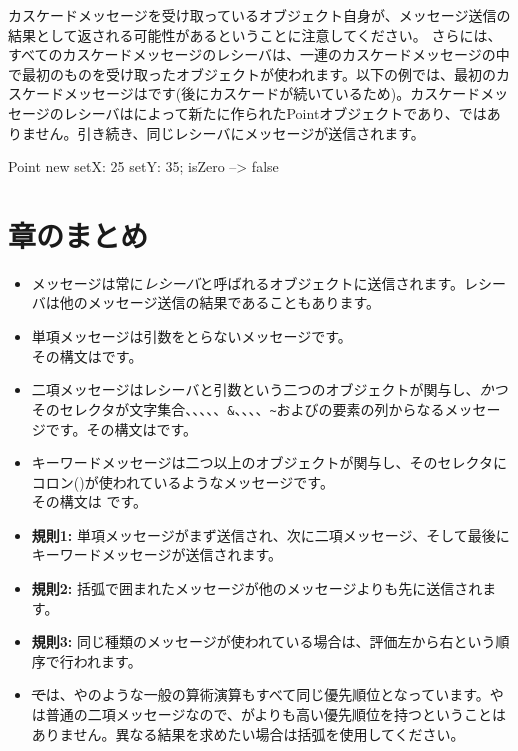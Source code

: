 \documentclass[a4paper,10pt,twoside]{book}
\begin{document}
カスケードメッセージを受け取っているオブジェクト自身が、メッセージ送信の結果として返される可能性があるということに注意してください。
さらには、すべてのカスケードメッセージのレシーバは、一連のカスケードメッセージの中で最初のものを受け取ったオブジェクトが使われます。以下の例では、最初のカスケードメッセージはです(後にカスケードが続いているため)。カスケードメッセージのレシーバはによって新たに作られたPointオブジェクトであり、ではありません。引き続き、同じレシーバにメッセージが送信されます。

\begin{code}{}
Point new setX: 25 setY: 35; isZero --> false
\end{code}

\section{章のまとめ}

\begin{itemize}
\item メッセージは常に\emph{レシーバ}と呼ばれるオブジェクトに送信されます。レシーバは他のメッセージ送信の結果であることもあります。

\item 単項メッセージは引数をとらないメッセージです。\\
その構文はです。

\item 二項メッセージはレシーバと引数という二つのオブジェクトが関与し、\emph{かつ}そのセレクタが文字集合\ct{+}、\ct{-}、\ct{*}、\ct{/}、\ct{|}、\texttt{\&}、\ct{=}、\ct{>}、\ct{<}、\texttt{\~}およびの要素の列からなるメッセージです。その構文はです。

\item キーワードメッセージは二つ以上のオブジェクトが関与し、そのセレクタにコロン(\ct{:})が使われているようなメッセージです。\\
その構文は
です。

\item \textbf{規則1:} 単項メッセージがまず送信され、次に二項メッセージ、そして最後にキーワードメッセージが送信されます。
\item \textbf{規則2:} 括弧で囲まれたメッセージが他のメッセージよりも先に送信されます。
\item \textbf{規則3:} 同じ種類のメッセージが使われている場合は、評価左から右という順序で行われます。
\item \st では、\ct{+}や\ct{*}のような一般の算術演算もすべて同じ優先順位となっています。\ct{+}や\ct{*}は普通の二項メッセージなので、\ct{*}が\ct{+}よりも高い優先順位を持つということはありません。異なる結果を求めたい場合は括弧を使用してください。
\end{itemize}

\ifx\wholebook\relax\else
\end{document}
